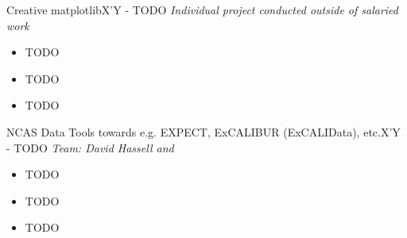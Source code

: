 \begin{projects}

\project
    {Creative matplotlib}{X'Y - TODO}
	{ \textit{Individual project conducted outside of salaried work}}
	{
	\begin{itemize}
	\setlength\itemsep{0.3em}
     \item TODO
         \item TODO
              \item TODO
     \end{itemize}
}

\project
    {NCAS Data Tools towards e.g. EXPECT, ExCALIBUR (ExCALIData), etc.}{X'Y - TODO}
	{ \textit{Team: David Hassell and \underline{}}}
	{
	\begin{itemize}
	\setlength\itemsep{0.3em}
     \item TODO
         \item TODO
              \item TODO
     \end{itemize}
}

    
\end{projects}    
\vspace{-3mm}

